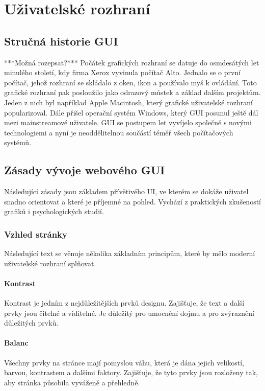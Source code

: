 \chapter{Uživatelské rozhraní}

\section{Stručná historie GUI}
***Možná rozepsat?***
Počátek grafických rozhraní se datuje do osmdesátých let minulého století, kdy firma Xerox vyvinula počítač Alto. Jednalo se o první počítač, jehož rozhraní se skládalo z oken, ikon a používalo myš k ovládání. Toto grafické rozhraní pak posloužilo jako odrazový můstek a základ dalším projektům. Jeden z nich byl například Apple Macintosh, který grafické uživatelské rozhraní popularizoval. Dále přišel operační systém Windows, který GUI posunul ještě dál mezi mainstreamové uživatele. GUI se postupem let vyvíjelo společně s novými technologiemi a nyní je neoddělitelnou součástí téměř všech počítačových systémů.

\section{Zásady vývoje webového GUI}
Následující zásady jsou základem přívětivého UI, ve kterém se dokáže uživatel snadno orientovat a které je příjemné na pohled. Vychází z praktických zkušeností grafiků i psychologických studií.

\subsection{Vzhled stránky}
Následující text se věnuje několika základním principům, které by mělo moderní uživatelské rozhraní splňovat.\cite{principles_of_design}

\subsubsection*{Kontrast}
Kontrast je jedním z nejdůležitějších prvků designu. Zajišťuje, že text a další prvky jsou čitelné a viditelné. Je důležitý pro umocnění dojmu a pro zvýraznění důležitých prvků.

\subsubsection*{Balanc}
Všechny prvky na stránce mají pomyslou váhu, která je dána jejich velikostí, barvou, kontrastem a dalšími faktory. Zajišťuje, že tyto prvky jsou rozloženy tak, aby stránka působila vyváženě a přehledně.

